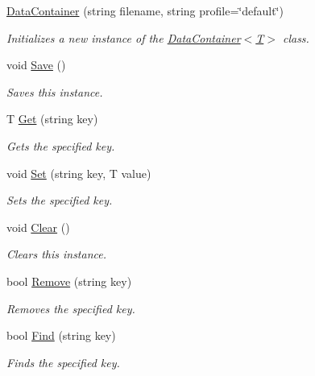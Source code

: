 \begin{DoxyCompactItemize}
\item 
\hyperlink{class_unity_serializer_n_g_1_1_file_preferences_1_1_data_container_a4b1f0577fa6ca4c776f3686345c60b54}{Data\+Container} (string filename, string profile=\char`\"{}default\char`\"{})
\begin{DoxyCompactList}\small\item\em Initializes a new instance of the \hyperlink{class_unity_serializer_n_g_1_1_file_preferences_1_1_data_container_a4b1f0577fa6ca4c776f3686345c60b54}{Data\+Container$<$\+T$>$} class. \end{DoxyCompactList}\item 
void \hyperlink{class_unity_serializer_n_g_1_1_file_preferences_1_1_data_container_afe011b5fda126cda070a579b7ddaf757}{Save} ()
\begin{DoxyCompactList}\small\item\em Saves this instance. \end{DoxyCompactList}\item 
T \hyperlink{class_unity_serializer_n_g_1_1_file_preferences_1_1_data_container_abfbe4c458404a00ea26ff5016052b0cb}{Get} (string key)
\begin{DoxyCompactList}\small\item\em Gets the specified key. \end{DoxyCompactList}\item 
void \hyperlink{class_unity_serializer_n_g_1_1_file_preferences_1_1_data_container_a429dcbda1023683c5dc8165b656b0207}{Set} (string key, T value)
\begin{DoxyCompactList}\small\item\em Sets the specified key. \end{DoxyCompactList}\item 
void \hyperlink{class_unity_serializer_n_g_1_1_file_preferences_1_1_data_container_a35be729a4fa39d872f62d6023c643421}{Clear} ()
\begin{DoxyCompactList}\small\item\em Clears this instance. \end{DoxyCompactList}\item 
bool \hyperlink{class_unity_serializer_n_g_1_1_file_preferences_1_1_data_container_a66e36bd3263585e4436774a54556de89}{Remove} (string key)
\begin{DoxyCompactList}\small\item\em Removes the specified key. \end{DoxyCompactList}\item 
bool \hyperlink{class_unity_serializer_n_g_1_1_file_preferences_1_1_data_container_af6486648b0ee1a9aa968f45c4fbf1e68}{Find} (string key)
\begin{DoxyCompactList}\small\item\em Finds the specified key. \end{DoxyCompactList}\end{DoxyCompactItemize}


